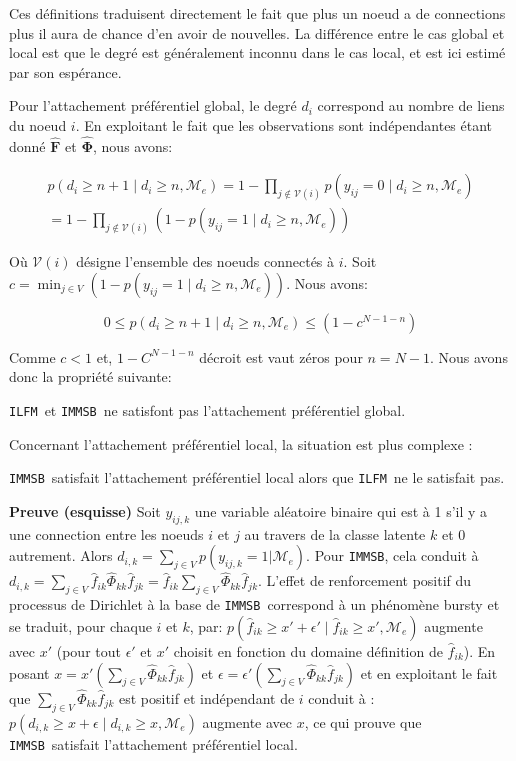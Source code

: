 \documentclass[french]{hermes-journal}
\newcommand{\ilfm}{\texttt{ILFM}}
\newcommand{\immsb}{\texttt{IMMSB}}
\newcommand{\pr}{p}
\newcommand{\mat}[1]{\bm{#1}}
\begin{document}
Ces définitions traduisent directement le fait que plus un noeud a de connections plus il aura de chance d'en avoir de nouvelles. La différence entre le cas global et local est que le degré est généralement inconnu dans le cas local, et est ici estimé par son espérance.

Pour l'attachement préférentiel global, le degré $d_i$ correspond au nombre de liens du noeud $i$. En exploitant le fait que les observations sont indépendantes étant donné $\mat{\hat{F}}$ et $\mat{\hat{\Phi}}$, nous avons:


\begin{align}
\pr(d_{i} \ge n+1 \mid d_{i} \ge n, \mathcal{M}_e) = 1 - \prod_{j \notin \mathcal{V}(i)} p(y_{ij} = 0 \mid d_{i} \ge n, \mathcal{M}_e) \nonumber \\
= 1 - \prod_{j \notin \mathcal{V}(i)} (1 - p(y_{ij} = 1 \mid d_{i} \ge n, \mathcal{M}_e)) \nonumber
\end{align}

Où $\mathcal{V}(i)$ désigne l'ensemble des noeuds connectés à $i$. Soit $c=\min_{j \in V}  (1-p(y_{ij} = 1 \mid d_{i} \ge n, \mathcal{M}_e))$. Nous avons:

\[
0 \le \pr(d_{i} \ge n+1 \mid d_{i} \ge n, \mathcal{M}_e) \le (1 - c^{N-1-n})
\]

Comme $c < 1$ et, $1- C^{N-1-n}$ décroit est vaut zéros pour $n=N-1$. Nous avons donc la propriété suivante:

\begin{proposition}[]
\label{pref-attch-glob}
\ilfm\ et \immsb\ ne satisfont pas l'attachement préférentiel global.
\end{proposition}

Concernant l'attachement préférentiel local, la situation est plus complexe :

\begin{proposition}[]
\label{pref-attch-loc}
\immsb\ satisfait l'attachement préférentiel local alors que \ilfm\ ne le satisfait pas.
\end{proposition}

\noindent \textbf{Preuve (esquisse)} Soit $y_{ij,k}$ une variable aléatoire binaire qui est à 1 s'il y a   une connection entre les noeuds $i$ et $j$ au travers de la classe latente $k$ et 0 autrement.
Alors $d_{i,k} = \sum_{j \in V} \pr(y_{ij,k} =1 | \mathcal{M}_e)$.
Pour \immsb, cela conduit à $d_{i,k} = \sum_{j \in V} \hat{f}_{ik} \hat{\Phi}_{kk} \hat{f}_{jk} = \hat{f}_{ik} \sum_{j \in V} \hat{\Phi}_{kk} \hat{f}_{jk}$.
L'effet de renforcement positif du processus de Dirichlet \cite{HDP} à la base de \immsb\ correspond à un phénomène bursty et se traduit, pour chaque $i$ et $k$, par: $\pr(\hat{f}_{ik} \ge x'+\epsilon' \mid \hat{f}_{ik} \ge x',\mathcal{M}_e)$ augmente avec  $x'$ (pour tout $\epsilon'$ et $x'$ choisit en fonction du domaine définition de  $\hat{f}_{ik}$).
En posant $x=x'(\sum_{j\in V} \hat{\Phi}_{kk} \hat{f}_{jk})$ et $\epsilon = \epsilon'(\sum_{j\in V} \hat{\Phi}_{kk} \hat{f}_{jk})$ et en exploitant le fait que $\sum_{j\in V} \hat{\Phi}_{kk} \hat{f}_{jk}$ est positif et indépendant de $i$ conduit à : $\pr(d_{i,k} \ge x+\epsilon \mid d_{i,k} \ge x, \mathcal{M}_e)$ augmente avec $x$, ce qui prouve que \immsb\ satisfait l'attachement préférentiel local.
\end{document}
